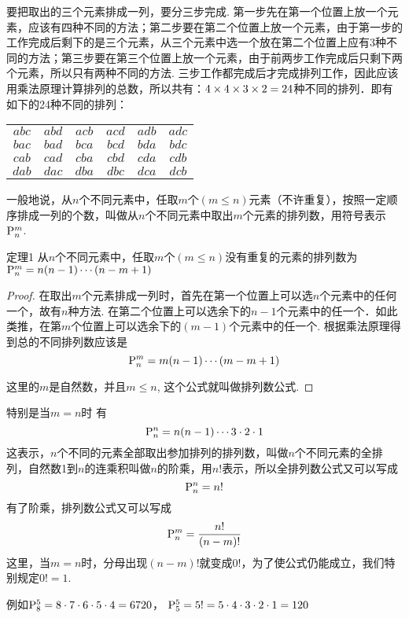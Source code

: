 \begin{solution}
要把取出的三个元素排成一列，要分三步完成. 第一步先在第一个位置上放一个元素，应该有四种不同的方法；第二步要在第二个位置上放一个元素，由于第一步的工作完成后剩下的是三个元素，从三个元素中选一个放在第二个位置上应有3种不同的方法；第三步要在第三个位置上放一个元素，由于前两步工作完成后只剩下两个元素，所以只有两种不同的方法. 三步工作都完成后才完成排列工作，因此应该用乘法原理计算排列的总数，所以共有：$4\times4\times3\times2=24$种不同的排列．即有如下的24种不同的排列：
\begin{center}
\begin{tabular}{cccccc}
$abc$& $abd$& $acb$ &$acd$ &$adb$& $adc$\\
$bac$& $bad$ &$bca$& $bcd$ &$bda$& $bdc$\\
$cab$& $cad$ &$cba$& $cbd$ &$cda$& $cdb$\\
$dab$& $dac$& $dba$ &$dbc$& $dca$ &$dcb$    
\end{tabular}
\end{center}
\end{solution}

一般地说，从$n$个不同元素中，任取$m$个$(m\le n)$元素（不许重复），按照一定顺序排成一列的个数，叫做从$n$个不同元素中取出$m$个元素的排列数，用符号表示${\rm P}^{m}_{n}$.

\begin{blk}
  {定理1} 从$n$个不同元素中，任取$m$个$(m\le n)$没有重复的元素的排列数为${\rm P}^{m}_{n}=n(n-1)\cdots (n-m+1)$
\end{blk}

\begin{proof}
    在取出$m$个元素排成一列时，首先在第一个位置上可以选$n$个元素中的任何一个，故有$n$种方法. 在第二个位置上可以选余下的$n-1$个元素中的任一个．如此类推，在第$m$个位置上可以选余下的$(m-1)$个元素中的任一个. 根据乘法原理得到总的不同排列数应该是
\[{\rm P}^{m}_{n}=m(n-1)\cdots(m-m+1)\]

这里的$m$是自然数，并且$m\le n$, 这个公式就叫做排列数公式.
\end{proof}

特别是当$m=n$时 有
\[{\rm P}^{n}_{n}=n(n-1)\cdots3\cdot2\cdot1\]
这表示，$n$个不同的元素全部取出参加排列的排列数，叫做$n$个不同元素的全排列，自然数1到$n$的连乘积叫做$n$的阶乘，用$n!$表示，所以全排列数公式又可以写成
\[{\rm P}^{n}_{n}=n!\]
有了阶乘，排列数公式又可以写成
\[{\rm P}^{m}_{n}=\dfrac{n!}{(n-m)!}\]
这里，当$m=n$时，分母出现$(n-m)!$就变成$0!$，为了使公式仍能成立，我们特别规定$0!=1$.

例如${\rm P}^{5}_{8}=8\cdot  7\cdot 6\cdot 5\cdot 4=6720$，
${\rm P}^{5}_{5}=5!=5\cdot 4\cdot 3\cdot 2\cdot 1=120$


